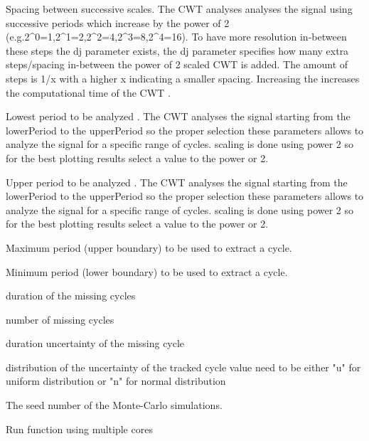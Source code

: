 \documentclass[a4paper]{book}
\begin{document}
\begin{Arguments}
\begin{ldescription}
\item[\code{dj}] Spacing between successive scales. The CWT analyses analyses the signal using successive periods
which increase by the power of 2 (e.g.2\textasciicircum{}0=1,2\textasciicircum{}1=2,2\textasciicircum{}2=4,2\textasciicircum{}3=8,2\textasciicircum{}4=16). To have more resolution
in-between these steps the dj parameter exists, the dj parameter specifies how many extra steps/spacing in-between
the power of 2 scaled CWT is added. The amount of steps is 1/x with a higher x indicating a smaller spacing.
Increasing the increases the computational time of the CWT .

\item[\code{lowerPeriod}] Lowest period to be analyzed .
The CWT analyses the signal starting from the lowerPeriod to the upperPeriod so the proper selection these
parameters allows to analyze the signal for a specific range of cycles.
scaling is done using power 2 so for the best plotting results select a value to the power or 2.

\item[\code{upperPeriod}] Upper period to be analyzed .
The CWT analyses the signal starting from the lowerPeriod to the upperPeriod so the proper selection these
parameters allows to analyze the signal for a specific range of cycles.
scaling is done using power 2 so for the best plotting results select a value to the power or 2.

\item[\code{period\_max}] Maximum period (upper boundary) to be used to extract a cycle.

\item[\code{period\_min}] Minimum period (lower boundary) to be used to extract a cycle.

\item[\code{missing\_cycle\_dur}] duration of the missing cycles

\item[\code{n\_cycles\_missing}] number of missing cycles 

\item[\code{missing\_cycle\_unc}] duration uncertainty of the missing cycle

\item[\code{missing\_cycle\_unc\_dist}] distribution of the uncertainty of the
tracked cycle value need to be either "u" for uniform distribution or
"n" for normal distribution  

\item[\code{seed\_nr}] The seed number of the Monte-Carlo simulations.

\item[\code{run\_multicore}] Run function using multiple cores 
\end{ldescription}
\end{Arguments}
\end{document}
